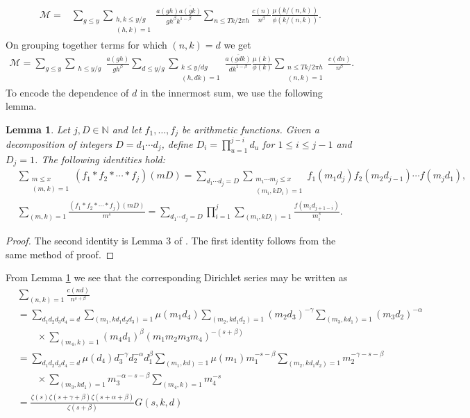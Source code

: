 \documentclass[oneside, 12pt]{amsart}
\newtheorem{lem}[prop]{Lemma}
\theoremstyle{definition}
\newcommand{\mc}{\mathcal}
\newcommand{\ol}{\overline}
\begin{document}
\begin{align*}
\mathcal{M} = &\sum_{g\leq y} 
\sum_{\substack{h,k\leq y/g\\ (h,k)=1}} \frac{a(gh)\ol{a(gk)}}{gh^\beta k^{1-\beta}}
\sum_{n\leq Tk/2\pi h} \frac{c(n)}{n^\beta}\frac{\mu(k/(n,k))}{\phi(k/(n,k))}.
\end{align*}
On grouping together terms for which $(n,k)=d$ we get  
\begin{align}   
	 \label{final M}      
\mc{M} 
= \sum_{g\leq y} 
\sum_{\substack{h\leq y/g}} \frac{a(gh)}{gh^\beta }
\sum_{d\leq y/g}
\sum_{\substack{k\leq y/dg\\ (h,dk)=1}}\frac{\ol{a(gdk)}}{dk^{1-\beta}}\frac{\mu(k)}{\phi(k)}
\sum_{\substack{n\leq Tk/2\pi h\\(n,k)=1}}\frac{c(dn)}{n^\beta}.
\end{align}
To encode the dependence of $d$ in the innermost sum, we use the following lemma.
\begin{lem}\label{DecompositionArithmeticFunction}
	Let $j, D\in \mathbb{N}$ and let $f_1, \dots, f_j$ be arithmetic functions. Given a decomposition of integers $D=d_1\cdots d_j$, define $D_i=\prod_{u=1}^{j-i}d_u$ for $1\leq i \leq j-1$ and $D_j=1$. The following identities hold:
	\begin{align*}
	&\sum_{\substack{m\leq x\\ (m,k)=1}}(f_1*f_2* \cdots *f_j)(mD)
	=\sum_{d_1 \cdots d_j=D}\sum_{\substack{m_1\cdots m_j\leq x\\ (m_i,kD_i)=1}}f_1(m_1d_j)f_2(m_2d_{j-1})\cdots f(m_jd_1),\\
	&\sum_{(m,k)=1}\frac{(f_1* f_2* \cdots *f_j)(mD)}{m^s}=\sum_{d_1 \cdots d_j=D}\prod_{i=1}^j\sum_{(m_i, kD_i)=1}\frac{f(m_id_{j+1-i})}{m_i^s}.
	\end{align*}
\end{lem}
\begin{proof}The second identity is Lemma 3 of \cite{CGGSimple}. The first identity follows from the same method of proof.
\end{proof}
From Lemma \ref{DecompositionArithmeticFunction} we see that the corresponding Dirichlet series may be written as
\begin{equation}
\begin{split}
\label{dirichlet series}
&\sum_{(n,k)=1}  \frac{c(nd)}{n^{s+\beta}}\\
& = \sum_{d_1d_2d_3d_4=d}\sum_{(m_1,kd_1d_2d_3)=1}\mu(m_1d_4)\sum_{ (m_2,kd_1d_2)=1} (m_2d_3)^{-\gamma}\sum_{ (m_3, kd_1)=1} (m_3d_2)^{-\alpha}
\\ 
& \qquad \times \sum_{ (m_4, k)=1} (m_4d_1)^\beta(m_1m_2m_3m_4)^{-(s+\beta)}
\\
&  =  \sum_{d_1d_2d_3d_4=d} \mu(d_4)d_3^{-\gamma}d_2^{-\alpha}d_1^\beta \sum_{(m_1, kd)=1}\mu(m_1) m_1^{-s-\beta} \sum_{(m_2,kd_1d_2)=1}m_2^{-\gamma-s-\beta}
\\  
&   \qquad \times  \sum_{ (m_3, kd_1)=1} m_3^{-\alpha-s-\beta}\sum_{(m_4, k)=1} m_4^{-s}
\\
& = \frac{\zeta(s)\zeta(s+\gamma+\beta)\zeta(s+\alpha+\beta)}{\zeta(s+\beta)}G(s,k,d)
\end{split}
\end{equation}
\end{document}
